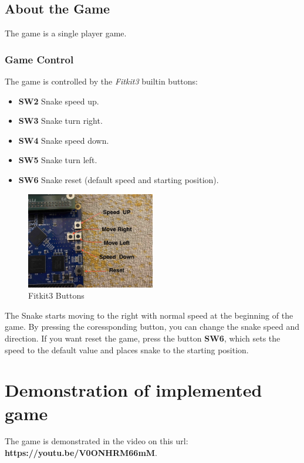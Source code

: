 \documentclass[a4paper, 11pt]{article}
\begin{document}
    \subsection{About the Game}\label{subsec:functionality-of-the-game}
    The game is a single player game.

    \subsubsection{Game Control}\label{sbsubsec:controling}
    The game is controlled by the \textit{Fitkit3} built\-in buttons:
    \begin{itemize}
        \item \textbf{SW2} \- Snake speed up.
        \item \textbf{SW3} \- Snake turn right.
        \item \textbf{SW4} \- Snake speed down.
        \item \textbf{SW5} \- Snake turn left.
        \item \textbf{SW6} \- Snake reset (default speed and starting position).
    \end{itemize}

    \begin{figure}[H]
        \centering
        \includegraphics[width=0.5\textwidth]{buttons}
        \caption{Fitkit3 Buttons}\label{fig:figure2}
    \end{figure}

    The Snake starts moving to the right with normal speed
    at the beginning of the game.
    By pressing the coressponding button, you can change the snake speed and direction.
    If you want reset the game, press the button \textbf{SW6}, which sets
    the speed to the default value and places snake to the starting position.

    \section{Demonstration of implemented game}\label{sec:demonstration}
    The game is demonstrated in the video on this url: \textbf{https://youtu.be/V0ONHRM66mM}.
\end{document}
